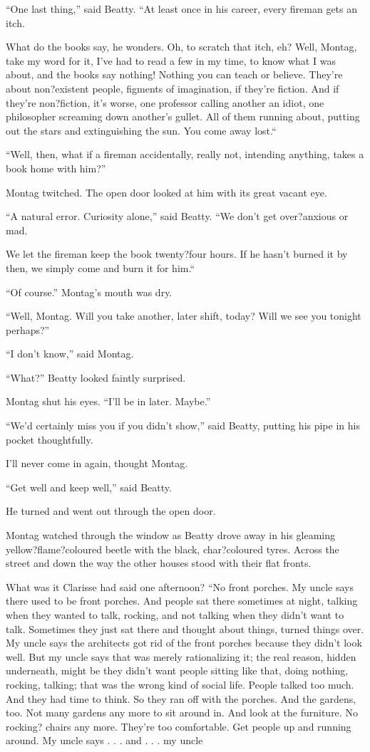 \documentclass[11pt,openany]{book}
\begin{document}
``One last thing,'' said Beatty. ``At least once in his career, every fireman gets an itch.

What do the books say, he wonders. Oh, to scratch that itch, eh? Well, Montag, take my word for it, I've had to read a few in my time, to know what I was about, and the books say nothing! Nothing you can teach or believe. They're about non?existent people, figments of imagination, if they're fiction. And if they're non?fiction, it's worse, one professor calling another an idiot, one philosopher screaming down another's gullet. All of them running about, putting out the stars and extinguishing the sun. You come away lost.``

``Well, then, what if a fireman accidentally, really not, intending anything, takes a book home with him?''

Montag twitched. The open door looked at him with its great vacant eye.

``A natural error. Curiosity alone,'' said Beatty. ``We don't get over?anxious or mad.

We let the fireman keep the book twenty?four hours. If he hasn't burned it by then, we simply come and burn it for him.``

``Of course.'' Montag's mouth was dry.

``Well, Montag. Will you take another, later shift, today? Will we see you tonight perhaps?''

``I don't know,'' said Montag.

``What?'' Beatty looked faintly surprised.

Montag shut his eyes. ``I'll be in later. Maybe.''

``We'd certainly miss you if you didn't show,'' said Beatty, putting his pipe in his pocket thoughtfully.

I'll never come in again, thought Montag.

``Get well and keep well,'' said Beatty.

He turned and went out through the open door.

Montag watched through the window as Beatty drove away in his gleaming yellow?flame?coloured beetle with the black, char?coloured tyres. Across the street and down the way the other houses stood with their flat fronts.

What was it Clarisse had said one afternoon? ``No front porches. My uncle says there used to be front porches. And people sat there sometimes at night, talking when they wanted to talk, rocking, and not talking when they didn't want to talk. Sometimes they just sat there and thought about things, turned things over. My uncle says the architects got rid of the front porches because they didn't look well. But my uncle says that was merely rationalizing it; the real reason, hidden underneath, might be they didn't want people sitting like that, doing nothing, rocking, talking; that was the wrong kind of social life. People talked too much. And they had time to think. So they ran off with the porches. And the gardens, too. Not many gardens any more to sit around in. And look at the furniture. No rocking? chairs any more. They're too comfortable. Get people up and running around. My uncle says . . . and . . . my uncle
\end{document}
